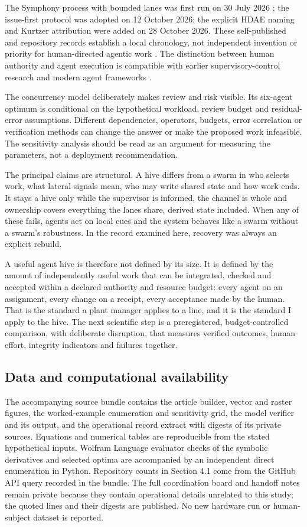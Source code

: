 \documentclass[11pt]{article}
\begin{document}
The Symphony process with bounded lanes was first run on 30 July 2026 \cite{symphony}; the issue-first protocol was adopted on 12 October 2026; the explicit HDAE naming and Kurtzer attribution were added on 28 October 2026. These self-published and repository records establish a local chronology, not independent invention or priority for human-directed agentic work \cite{issuefirst}. The distinction between human authority and agent execution is compatible with earlier supervisory-control research \cite{parasuraman2000,crandall2005} and modern agent frameworks \cite{autogen,chatdev}.

The concurrency model deliberately makes review and risk visible. Its six-agent optimum is conditional on the hypothetical workload, review budget and residual-error assumptions. Different dependencies, operators, budgets, error correlation or verification methods can change the answer or make the proposed work infeasible. The sensitivity analysis should be read as an argument for measuring the parameters, not a deployment recommendation.

The principal claims are structural. A hive differs from a swarm in who selects work, what lateral signals mean, who may write shared state and how work ends. It stays a hive only while the supervisor is informed, the channel is whole and ownership covers everything the lanes share, derived state included. When any of these fails, agents act on local cues and the system behaves like a swarm without a swarm's robustness. In the record examined here, recovery was always an explicit rebuild.

A useful agent hive is therefore not defined by its size. It is defined by the amount of independently useful work that can be integrated, checked and accepted within a declared authority and resource budget: every agent on an assignment, every change on a receipt, every acceptance made by the human. That is the standard a plant manager applies to a line, and it is the standard I apply to the hive. The next scientific step is a preregistered, budget-controlled comparison, with deliberate disruption, that measures verified outcomes, human effort, integrity indicators and failures together.

\subsection*{Data and computational availability}

The accompanying source bundle contains the article builder, vector and raster figures, the worked-example enumeration and sensitivity grid, the model verifier and its output, and the operational record extract with digests of its private sources. Equations and numerical tables are reproducible from the stated hypothetical inputs. Wolfram Language evaluator checks of the symbolic derivatives and selected optima are accompanied by an independent direct enumeration in Python. Repository counts in Section 4.1 come from the GitHub API query recorded in the bundle. The full coordination board and handoff notes remain private because they contain operational details unrelated to this study; the quoted lines and their digests are published. No new hardware run or human-subject dataset is reported.
\end{document}
